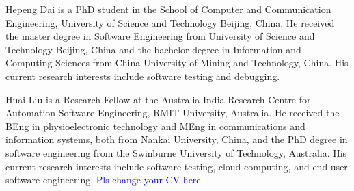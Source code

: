 \documentclass[10pt,journal,compsoc]{IEEEtran}
\begin{document}
\begin{IEEEbiography}{Hepeng Dai} is a PhD student in the School of Computer and Communication Engineering, University of Science and Technology Beijing, China. He received the master degree in Software Engineering from University of Science and Technology Beijing, China and the bachelor degree in Information and Computing Sciences from China University of Mining and Technology, China. His current research interests include software testing and debugging.
\end{IEEEbiography}

\begin{IEEEbiography}{Huai Liu} is a Research Fellow at the Australia-India Research Centre for Automation Software Engineering, RMIT University, Australia. He received the BEng in physioelectronic technology and MEng in communications and information systems, both from Nankai University, China, and the PhD degree in software engineering from the Swinburne University of Technology, Australia. His current research interests include software testing, cloud computing, and end-user software engineering. \textcolor{blue} {Pls change your CV here.}
\end{IEEEbiography}
\end{document}
